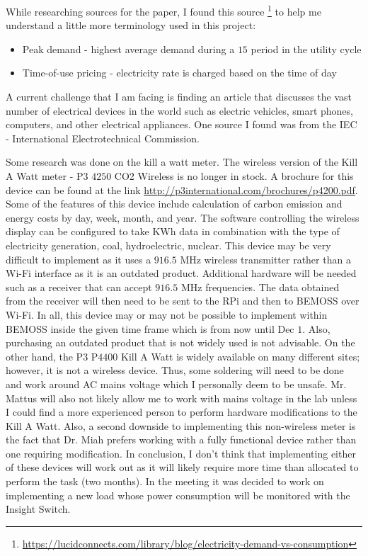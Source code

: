 \documentclass[fontsize=11pt, %
                             paper=letter, %
                             twoside, %
                             captions=tableheading,
                             index=totoc,
                             hyperref]{labbook}
\begin{document}
\begin{addmargin}[0cm]{0cm}
While researching sources for the paper, I found this source \footnote{\url{https://lucidconnects.com/library/blog/electricity-demand-vs-consumption}} to help me understand a little more terminology used in this project:
\begin{itemize}
\item Peak demand - highest average demand during a $15$ period in the utility cycle
\item Time-of-use pricing - electricity rate is charged based on the time of day
\end{itemize}

A current challenge that I am facing is finding an article that discusses the vast number of electrical devices in the world such as electric vehicles, smart phones, computers, and other electrical appliances. One source I found was from the IEC - International Electrotechnical Commission.  

Some research was done on the kill a watt meter. The wireless version of the Kill A Watt meter - P$3$ $4250$ CO2 Wireless is no longer in stock. A brochure for this device can be found at the link \url{http://p3international.com/brochures/p4200.pdf}. Some of the features of this device include calculation of carbon emission and energy costs by day, week, month, and year. The software controlling the wireless display can be configured to take KWh data in combination with the type of electricity generation, coal, hydroelectric, nuclear. This device may be very difficult to implement as it uses a $916.5$ MHz wireless transmitter rather than a Wi-Fi interface as it is an outdated product. Additional hardware will be needed such as a receiver that can accept $916.5$ MHz frequencies. The data obtained from the receiver will then need to be sent to the RPi and then to BEMOSS over Wi-Fi. In all, this device may or may not be possible to implement within BEMOSS inside the given time frame which is from now until Dec $1$. Also, purchasing an outdated product that is not widely used is not advisable.
\smallbreak\noindent
On the other hand, the P$3$ P$4400$ Kill A Watt is widely available on many different sites; however, it is not a wireless device. Thus, some soldering will need to be done and work around AC mains voltage which I personally deem to be unsafe. Mr. Mattus will also not likely allow me to work with mains voltage in the lab unless I could find a more experienced person to perform hardware modifications to the Kill A Watt. Also, a second downside to implementing this non-wireless meter is the fact that Dr. Miah prefers working with a fully functional device rather than one requiring modification.
\smallbreak\noindent
In conclusion, I don't think that implementing either of these devices will work out as it will likely require more time than allocated to perform the task (two months). 
\smallbreak\noindent
In the meeting it was decided to work on implementing a new load whose power consumption will be monitored with the Insight Switch.
\end{addmargin}
\end{document}
